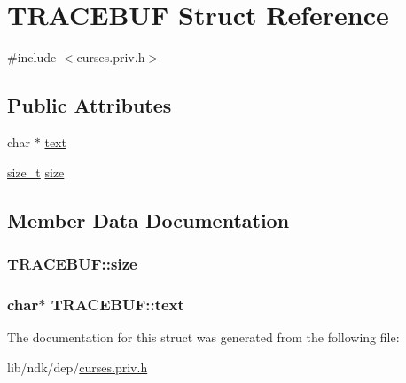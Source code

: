 \hypertarget{struct_t_r_a_c_e_b_u_f}{\section{T\-R\-A\-C\-E\-B\-U\-F Struct Reference}
\label{struct_t_r_a_c_e_b_u_f}
}


{\ttfamily \#include $<$curses.\-priv.\-h$>$}

\subsection*{Public Attributes}
\begin{DoxyCompactItemize}
\item 
char $\ast$ \hyperlink{struct_t_r_a_c_e_b_u_f_ad93ffcbc7135bd12874f40a7308d06c7}{text}
\item 
\hyperlink{nc__alloc_8h_a7b60c5629e55e8ec87a4547dd4abced4}{size\-\_\-t} \hyperlink{struct_t_r_a_c_e_b_u_f_a46a5a870126c42de04d04f0deace16e0}{size}
\end{DoxyCompactItemize}


\subsection{Member Data Documentation}
\hypertarget{struct_t_r_a_c_e_b_u_f_a46a5a870126c42de04d04f0deace16e0}{
\subsubsection[{size}]{ T\-R\-A\-C\-E\-B\-U\-F\-::size}}\label{struct_t_r_a_c_e_b_u_f_a46a5a870126c42de04d04f0deace16e0}
\hypertarget{struct_t_r_a_c_e_b_u_f_ad93ffcbc7135bd12874f40a7308d06c7}{
\subsubsection[{text}]{\setlength{\rightskip}{0pt plus 5cm}char$\ast$ T\-R\-A\-C\-E\-B\-U\-F\-::text}}\label{struct_t_r_a_c_e_b_u_f_ad93ffcbc7135bd12874f40a7308d06c7}


The documentation for this struct was generated from the following file\-:\begin{DoxyCompactItemize}
\item 
lib/ndk/dep/\hyperlink{curses_8priv_8h}{curses.\-priv.\-h}\end{DoxyCompactItemize}

